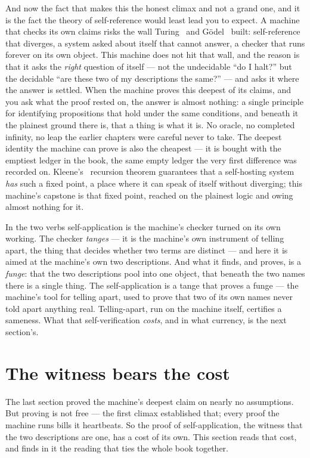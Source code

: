 And now the fact that makes this the honest climax and not a grand one, and it is the fact the theory of self-reference
would least lead you to expect. A machine that checks its own claims risks the wall Turing~\cite{turing1936} and
G\"odel~\cite{godel1931} built: self-reference that diverges, a system asked about itself that cannot answer, a checker
that runs forever on its own object. This machine does not hit that wall, and the reason is that it asks the \emph{right}
question of itself --- not the undecidable ``do I halt?'' but the decidable ``are these two of my descriptions the
same?'' --- and asks it where the answer is settled. When the machine proves this deepest of its claims, and you ask what
the proof rested on, the answer is almost nothing: a single principle for identifying propositions that hold under the
same conditions, and beneath it the plainest ground there is, that a thing is what it is. No oracle, no completed
infinity, no leap the earlier chapters were careful never to take. The deepest identity the machine can prove is also the
cheapest --- it is bought with the emptiest ledger in the book, the same empty ledger the very first difference was
recorded on. Kleene's~\cite{kleene1952} recursion theorem guarantees that a self-hosting system \emph{has} such a fixed
point, a place where it can speak of itself without diverging; this machine's capstone is that fixed point, reached on
the plainest logic and owing almost nothing for it.

In the two verbs self-application is the machine's checker turned on its own working. The checker \emph{tanges} --- it is
the machine's own instrument of telling apart, the thing that decides whether two terms are distinct --- and here it is
aimed at the machine's own two descriptions. And what it finds, and proves, is a \emph{funge}: that the two descriptions
pool into one object, that beneath the two names there is a single thing. The self-application is a tange that proves a
funge --- the machine's tool for telling apart, used to prove that two of its own names never told apart anything real.
Telling-apart, run on the machine itself, certifies a sameness. What that self-verification \emph{costs}, and in what
currency, is the next section's.

\section{The witness bears the cost}

The last section proved the machine's deepest claim on nearly no assumptions. But proving is not free --- the first
climax established that; every proof the machine runs bills it heartbeats. So the proof of self-application, the witness
that the two descriptions are one, has a cost of its own. This section reads that cost, and finds in it the reading that
ties the whole book together.

